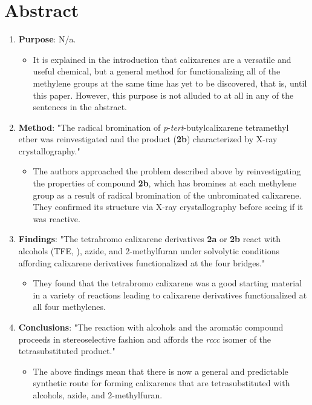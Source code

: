 \documentclass[titlepage]{article}
\begin{document}
\pagestyle{main}
\renewcommand{\leftmark}{Written Assignment 3}
\section*{Abstract}
\begin{enumerate}
    \item \textbf{Purpose}: N/a.
    \begin{itemize}
        \item It is explained in the introduction that calixarenes are a versatile and useful chemical, but a general method for functionalizing all of the methylene groups at the same time has yet to be discovered, that is, until this paper. However, this purpose is not alluded to at all in any of the sentences in the abstract.
    \end{itemize}
    \item \textbf{Method}: "The radical bromination of \emph{p}-\emph{tert}-butylcalixarene tetramethyl ether was reinvestigated and the product (\textbf{2b}) characterized by X-ray crystallography."
    \begin{itemize}
        \item The authors approached the problem described above by reinvestigating the properties of compound \textbf{2b}, which has bromines at each methylene group as a result of radical bromination of the unbrominated calixarene. They confirmed its structure via X-ray crystallography before seeing if it was reactive.
    \end{itemize}
    \item \textbf{Findings}: "The tetrabromo calixarene derivatives \textbf{2a} or \textbf{2b} react with alcohols (TFE, ), azide, and 2-methylfuran under solvolytic conditions affording calixarene derivatives functionalized at the four bridges."
    \begin{itemize}
        \item They found that the tetrabromo calixarene was a good starting material in a variety of reactions leading to calixarene derivatives functionalized at all four methylenes.
    \end{itemize}
    \item \textbf{Conclusions}: "The reaction with alcohols and the aromatic compound proceeds in stereoselective fashion and affords the \emph{rccc} isomer of the tetrasubstituted product."
    \begin{itemize}
        \item The above findings mean that there is now a general and predictable synthetic route for forming calixarenes that are tetrasubstituted with alcohols, azide, and 2-methylfuran.
    \end{itemize}
\end{enumerate}
\end{document}
